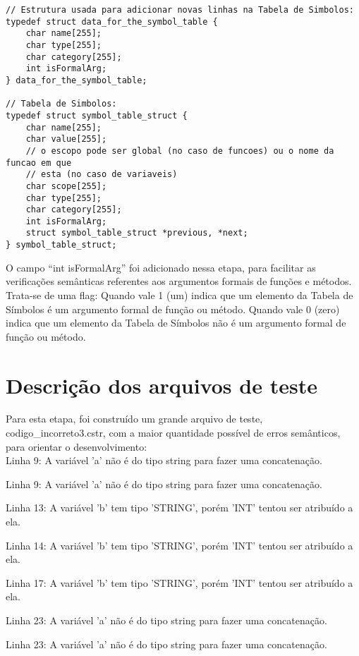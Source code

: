 \documentclass[12pt]{article}
\begin{document}
\begin{lstlisting}
// Estrutura usada para adicionar novas linhas na Tabela de Simbolos:
typedef struct data_for_the_symbol_table {
    char name[255];
    char type[255];
    char category[255];
    int isFormalArg;
} data_for_the_symbol_table;

// Tabela de Simbolos:
typedef struct symbol_table_struct {
    char name[255];
    char value[255];
    // o escopo pode ser global (no caso de funcoes) ou o nome da funcao em que
    // esta (no caso de variaveis)
    char scope[255];
    char type[255];
    char category[255];
    int isFormalArg;
    struct symbol_table_struct *previous, *next;
} symbol_table_struct;
\end{lstlisting}

O campo ``int isFormalArg'' foi adicionado nessa etapa, para facilitar as verificações semânticas referentes aos argumentos formais de funções e métodos. Trata-se de uma flag: Quando vale 1 (um) indica que um elemento da Tabela de Símbolos é um argumento formal de função ou método. Quando vale 0 (zero) indica que um elemento da Tabela de Símbolos não é um argumento formal de função ou método.

\section{Descrição dos arquivos de teste}

\indent

Para esta etapa, foi construído um grande arquivo de teste, codigo\_incorreto3.cstr, com a maior quantidade possível de erros semânticos, para orientar o desenvolvimento:\\






Linha 9: A variável 'a' não é do tipo string para fazer uma concatenação.

Linha 9: A variável 'a' não é do tipo string para fazer uma concatenação.

Linha 13: A variável 'b' tem tipo 'STRING', porém 'INT' tentou ser atribuído a ela.

Linha 14: A variável 'b' tem tipo 'STRING', porém 'INT' tentou ser atribuído a ela.

Linha 17: A variável 'b' tem tipo 'STRING', porém 'INT' tentou ser atribuído a ela.

Linha 23: A variável 'a' não é do tipo string para fazer uma concatenação.

Linha 23: A variável 'a' não é do tipo string para fazer uma concatenação.
\end{document}
